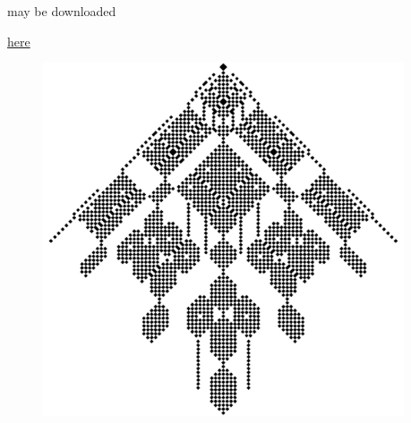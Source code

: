 \documentclass{article}
\begin{document}
\newpage

\thispagestyle{empty}

\vspace*{\fill}

\begin{center}
\qlanth may be downloaded

\href{https://github.com/zia-lab/qlanth}{here}
\vspace{-0.4cm}
\begin{figure}[h!]
	\begin{center}
		\includegraphics[width=0.95\textwidth]{pr_code.png}
	\end{center}
\end{figure}
\end{center}

\vspace*{\fill}

\cleardoublepage

\thispagestyle{empty}

\vspace*{\fill}
\end{document}
